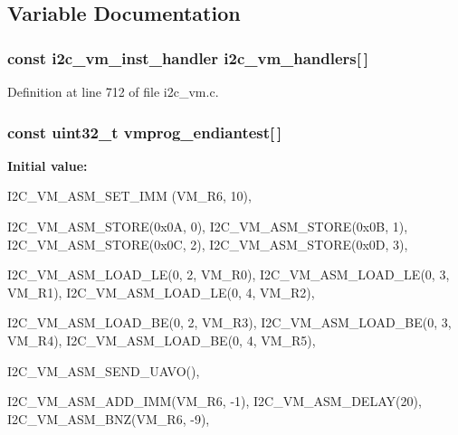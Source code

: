 \subsection{\-Variable \-Documentation}
\hypertarget{group___generic_i2_c_sensor_gab83cd2149bbe6ea9179b75ee8a02071e}{
\subsubsection[{i2c\-\_\-vm\-\_\-handlers}]{\setlength{\rightskip}{0pt plus 5cm}const {\bf i2c\-\_\-vm\-\_\-inst\-\_\-handler} {\bf i2c\-\_\-vm\-\_\-handlers}\mbox{[}$\,$\mbox{]}}}\label{group___generic_i2_c_sensor_gab83cd2149bbe6ea9179b75ee8a02071e}


\-Definition at line 712 of file i2c\-\_\-vm.\-c.

\hypertarget{group___generic_i2_c_sensor_ga97db8eb6770f15d92457ae44bf607d31}{
\subsubsection[{vmprog\-\_\-endiantest}]{\setlength{\rightskip}{0pt plus 5cm}const uint32\-\_\-t {\bf vmprog\-\_\-endiantest}\mbox{[}$\,$\mbox{]}}}\label{group___generic_i2_c_sensor_ga97db8eb6770f15d92457ae44bf607d31}
{\bfseries \-Initial value\-:}
\begin{DoxyCode}
 {
        I2C_VM_ASM_SET_IMM (VM_R6, 10),

        I2C_VM_ASM_STORE(0x0A, 0),
        I2C_VM_ASM_STORE(0x0B, 1),
        I2C_VM_ASM_STORE(0x0C, 2),
        I2C_VM_ASM_STORE(0x0D, 3),

        
        I2C_VM_ASM_LOAD_LE(0, 2, VM_R0),
        I2C_VM_ASM_LOAD_LE(0, 3, VM_R1),
        I2C_VM_ASM_LOAD_LE(0, 4, VM_R2),

        
        I2C_VM_ASM_LOAD_BE(0, 2, VM_R3),
        I2C_VM_ASM_LOAD_BE(0, 3, VM_R4),
        I2C_VM_ASM_LOAD_BE(0, 4, VM_R5),

        I2C_VM_ASM_SEND_UAVO(), 

        I2C_VM_ASM_ADD_IMM(VM_R6, -1),
        I2C_VM_ASM_DELAY(20),
        I2C_VM_ASM_BNZ(VM_R6, -9),
}
\end{DoxyCode}


